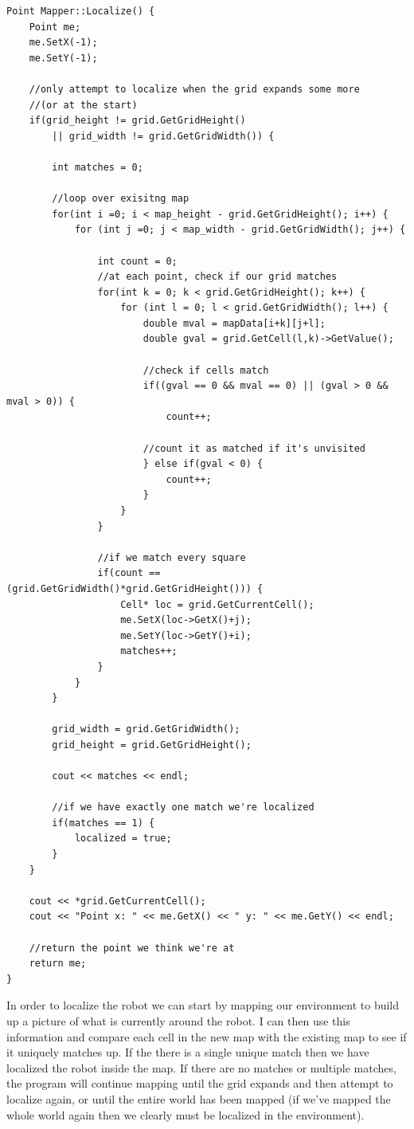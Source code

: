 \documentclass{article}
\begin{document}
\begin{lstlisting}[style=customcpp, caption=Function for the localization of a robot.]
Point Mapper::Localize() {
	Point me;
	me.SetX(-1);
	me.SetY(-1);

	//only attempt to localize when the grid expands some more
	//(or at the start)
	if(grid_height != grid.GetGridHeight() 
		|| grid_width != grid.GetGridWidth()) {

		int matches = 0;

		//loop over exisitng map
		for(int i =0; i < map_height - grid.GetGridHeight(); i++) {
			for (int j =0; j < map_width - grid.GetGridWidth(); j++) {

				int count = 0;
				//at each point, check if our grid matches
				for(int k = 0; k < grid.GetGridHeight(); k++) {
					for (int l = 0; l < grid.GetGridWidth(); l++) {
						double mval = mapData[i+k][j+l];
						double gval = grid.GetCell(l,k)->GetValue();

						//check if cells match
						if((gval == 0 && mval == 0) || (gval > 0 && mval > 0)) {
							count++;

						//count it as matched if it's unvisited
						} else if(gval < 0) {
							count++;
						}
					}
				}

				//if we match every square
				if(count == (grid.GetGridWidth()*grid.GetGridHeight())) {
					Cell* loc = grid.GetCurrentCell();
					me.SetX(loc->GetX()+j);
					me.SetY(loc->GetY()+i);
					matches++;
				}
			}
		}

		grid_width = grid.GetGridWidth();
		grid_height = grid.GetGridHeight();

		cout << matches << endl;

		//if we have exactly one match we're localized
		if(matches == 1) {
			localized = true;
		}
	}

	cout << *grid.GetCurrentCell();
	cout << "Point x: " << me.GetX() << " y: " << me.GetY() << endl;

	//return the point we think we're at
	return me;
}
\end{lstlisting}

In order to localize the robot we can start by mapping our environment to build up a picture of what is currently around the robot. I can then use this information and compare each cell in the new map with the existing map to see if it uniquely matches up. If the there is a single unique match then we have localized the robot inside the map. If there are no matches or multiple matches, the program will continue mapping until the grid expands and then attempt to localize again, or until the entire world has been mapped (if we've mapped the whole world again then we clearly must be localized in the environment).
\end{document}
